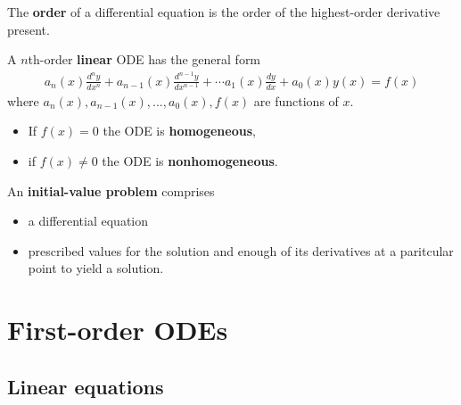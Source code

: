 \documentclass{article}
\begin{document}
\begin{definition}
	The \textbf{order} of a differential equation is the order of the highest-order derivative present.
\end{definition}

\begin{definition}
	A $n$th-order \textbf{linear} ODE has the general form
	\begin{align*}
		a_n(x) \frac{d^ny}{dx^n}+a_{n-1}(x)\frac{d^{n-1}y}{dx^{n-1}}+\cdots a_1(x)\frac{dy}{dx}+a_0(x)y(x)= f(x)
	\end{align*}
	where $a_n(x), a_{n-1}(x), ..., a_0(x), f(x)$ are functions of $x$.
	\begin{itemize}
		\item If $f(x)=0$ the ODE is \textbf{homogeneous},
		\item if $f(x)\not=0$ the ODE is \textbf{nonhomogeneous}.
	\end{itemize}
\end{definition}

\begin{definition}
	An \textbf{initial-value problem} comprises
	\begin{itemize}
		\item a differential equation
		\item prescribed values for the solution and enough of its derivatives at a paritcular point to yield a solution.
	\end{itemize}
\end{definition}



\section{First-order ODEs}



\setcounter{subsection}{1}
\subsection{Linear equations}
\end{document}
